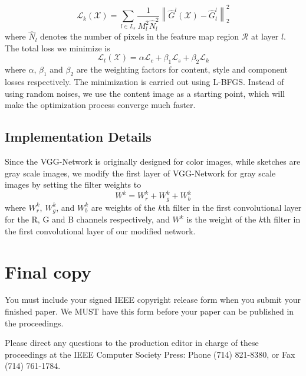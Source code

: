 \documentclass[10pt,twocolumn,letterpaper]{article}
\begin{document}
\begin{equation}
\mathcal{L}_{k} \left( \mathcal{X} \right) = \sum\limits_{l \in {L_s}} {\frac{1}{{M_l^2{\hat N}_l^2}}\left\| {{{\hat G}^l}\left( \mathcal{X} \right) - {\hat G}_t^l} \right\|_2^2} 
\label{eq:component_loss}
\end{equation}
where ${\hat N}_l$ denotes the number of pixels in the feature map region $\mathcal R$ at layer $l$. The total loss we minimize is 
\begin{equation}
\mathcal{L}_{t}\left( \mathcal{X} \right) = \alpha \mathcal{L}_{c} + \beta_1 \mathcal{L}_{s} + \beta_2 \mathcal{L}_{k}
\label{eq:Total_loss}
\end{equation}
where $\alpha$, $\beta_1$ and $\beta_2$ are the weighting factors for content, style and component losses respectively. The minimization is carried out using L-BFGS. Instead of using random noises, we use the content image as a starting point, which will make the optimization process converge much faster. 

\subsection{Implementation Details}

Since the VGG-Network is originally designed for color images, while sketches are gray scale images, we modify the first layer of VGG-Network for gray scale images by setting the filter weights to
\begin{equation}
W^{k} = W^{k}_r+W^{k}_g+W^{k}_b
\label{eq:VGG_weights}
\end{equation}
where $W^{k}_r$, $W^{k}_g$, and $W^{k}_b$ are weights of the $k$th filter in the first convolutional layer for the R, G and B channels respectively, and $W^{k}$ is the weight of the $k$th filter in the first convolutional layer of our modified network.

\section{Final copy}

You must include your signed IEEE copyright release form when you submit
your finished paper. We MUST have this form before your paper can be
published in the proceedings.

Please direct any questions to the production editor in charge of these
proceedings at the IEEE Computer Society Press: Phone (714) 821-8380, or
Fax (714) 761-1784.

{\small


}
\end{document}
